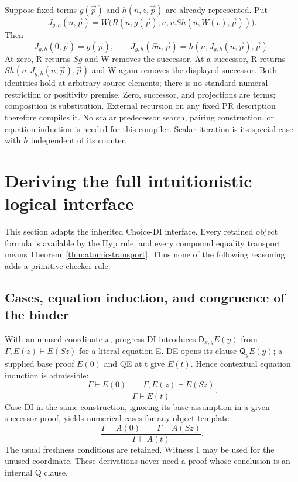 \documentclass[11pt,letterpaper]{article}
\theoremstyle{definition}\newtheorem{definition}[theorem]{Definition}
\theoremstyle{remark}\newtheorem{remark}[theorem]{Remark}
\newcommand{\D}{\ensuremath{\mathsf D}}
\newcommand{\Q}{\ensuremath{\mathsf Q}}
\begin{document}
Suppose fixed terms $g(\vec p)$ and $h(n,z,\vec p)$ are already
represented. Put
\[
 J_{g,h}(n,\vec p)=
 W\bigl(R(n,g(\vec p);u,v.S h(u,W(v),\vec p))\bigr).
 \tag{Compiler}\label{eq:compiler}
\]
Then
\[
 J_{g,h}(0,\vec p)=g(\vec p),\qquad
 J_{g,h}(Sn,\vec p)=h(n,J_{g,h}(n,\vec p),\vec p).
\]
At zero, R returns $Sg$ and W removes the successor. At a successor,
R returns $S h(n,J_{g,h}(n,\vec p),\vec p)$ and W again removes
the displayed successor. Both identities hold at arbitrary source
elements; there is no standard-numeral restriction or positivity premise.
Zero, successor, and projections are terms; composition is substitution.
External recursion on any fixed PR description therefore compiles it.
No scalar predecessor search, pairing construction, or equation induction
is needed for this compiler. Scalar iteration is its special case with
$h$ independent of its counter.

\section{Deriving the full intuitionistic logical interface}
\label{sec:logic}

This section adapts the inherited Choice-DI interface\cite{elimination,recursor}.
Every retained object formula is available by the Hyp rule, and
every compound equality transport means Theorem~\ref{thm:atomic-transport}.
Thus none of the following reasoning adds a primitive checker rule.

\subsection{Cases, equation induction, and congruence of the binder}

With an unused coordinate $x$, progress DI introduces $\D_{x,y}E(y)$
from $\Gamma,E(z)\vdash E(Sz)$ for a literal equation E. DE opens
its clause $\Q_yE(y)$; a supplied base proof $E(0)$ and QE at t give
$E(t)$. Hence contextual equation induction is admissible:
\[
 \frac{\Gamma\vdash E(0)\qquad\Gamma,E(z)\vdash E(Sz)}
      {\Gamma\vdash E(t)}. \tag{EI}\label{rule:EI}
\]
Case DI in the same construction, ignoring its base assumption in a
given successor proof, yields numerical cases for any object template:
\[
 \frac{\Gamma\vdash A(0)\qquad\Gamma\vdash A(Sz)}
      {\Gamma\vdash A(t)}. \tag{NC}\label{rule:NC}
\]
The usual freshness conditions are retained. Witness 1 may be used
for the unused coordinate. These derivations never need a proof whose
conclusion is an internal Q clause.
\end{document}
